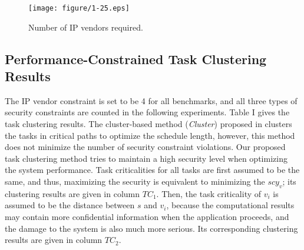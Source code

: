 \documentclass[conference]{IEEEtran}
\begin{document}
\begin{figure}[!t]
\centering
\hspace{-0.5em}
\texttt{[image: figure/1-25.eps]}
\caption{Number of IP vendors required.}
\vspace{-0.5em}
\label{fig:IP_vendor}
\end{figure}


\subsection{Performance-Constrained Task Clustering Results}


The IP vendor constraint is set to be 4 for all benchmarks, and all three types of security constraints are counted in the following experiments. Table I gives the task clustering results. The cluster-based method (\textit{Cluster}) proposed in \cite{article:CL} clusters the tasks in critical paths to optimize the schedule length, however, this method does not minimize the number of security constraint violations. Our proposed task clustering method tries to maintain a high security level when optimizing the system performance. Task criticalities for all tasks are first assumed to be the same, and thus, maximizing the security is equivalent to minimizing the $scy_v$; its clustering results are given in column $TC_1$. Then, the task criticality of $v_i$ is assumed to be the distance between $s$ and $v_i$, because the computational results may contain more confidential information when the application proceeds, and the damage to the system is also much more serious. Its corresponding clustering results are given in column $TC_2$.
\end{document}
